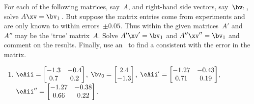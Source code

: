 





\sectionExercises



\begin{exercise} \label{ex:errmats} 
For each of the following matrices, say~\(A\), and right-hand side vectors, say~\(\bv_1\),
solve \(A\xv=\bv_1\)\,.
But suppose the matrix entries come from experiments and are only known to within errors~\(\pm0.05\).
Thus within  the given matrices~\(A'\) and~\(A''\) may be the `true' matrix~\(A\).
Solve \(A'\xv'=\bv_1\) and \(A''\xv''=\bv_1\) and comment on the results.
Finally, use an \svd\ to find a  consistent with the error in the matrix.

\begin{enumerate} \raggedright
\item \(\eAii=\begin{bmatrix} -1.3&-0.4\\0.7&0.2 \end{bmatrix}\),
\(\bv_{\arabic{enumii}}=\begin{bmatrix} 2.4\\-1.3 \end{bmatrix}\), 
\(\eAii'=\begin{bmatrix} -1.27&-0.43\\0.71&0.19 \end{bmatrix}\),
\(\eAii''=\begin{bmatrix} -1.27&-0.38\\0.66&0.22 \end{bmatrix}\).


\end{enumerate}
\end{exercise}
